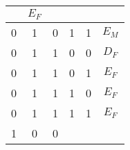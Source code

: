 \begin{table}[!htb]
\begin{tabular}{|ccccc|c|}
      & {\color[HTML]{FE0000} $E_F$}                                     \\ \hline
{\color[HTML]{00009B} 0}                                    & {\color[HTML]{00009B} 1}                                    & {\color[HTML]{00009B} 0}  
 
                                 & {\color[HTML]{00009B} 1}                                    & {\color[HTML]{00009B} 1}                             
 
      & {\color[HTML]{FE0000} $E_M$}                                  \\ \hline
{\color[HTML]{00009B} 0}                                     & {\color[HTML]{00009B} 1}                                    & {\color[HTML]{00009B} 1} 
 
                                  & {\color[HTML]{00009B} 0}                                    & {\color[HTML]{00009B} 0}                            
 
       & {\color[HTML]{FE0000} $D_F$}                                     \\ \hline
{\color[HTML]{00009B} 0}                                     & {\color[HTML]{00009B} 1}                                    & {\color[HTML]{00009B} 1} 
 
                                  & {\color[HTML]{00009B} 0}                                    & {\color[HTML]{00009B} 1}                            
 
       & {\color[HTML]{FE0000} $E_F$}                                     \\ \hline
{\color[HTML]{00009B} 0}                                     & {\color[HTML]{00009B} 1}                                    & {\color[HTML]{00009B} 1} 
 
                                  & {\color[HTML]{00009B} 1}                                    & {\color[HTML]{00009B} 0}                            
 
       & {\color[HTML]{FE0000} $E_F$}                                     \\ \hline
{\color[HTML]{00009B} 0}                                     & {\color[HTML]{00009B} 1}                                    & {\color[HTML]{00009B} 1} 
 
                                  & {\color[HTML]{00009B} 1}                                    & {\color[HTML]{00009B} 1}                            
 
       & {\color[HTML]{FE0000} $E_F$}                                     \\ \hline
{\color[HTML]{00009B} 1}                                     & {\color[HTML]{00009B} 0}                                    & {\color[HTML]{00009B} 0} 
 

\end{tabular}
\end{table}
